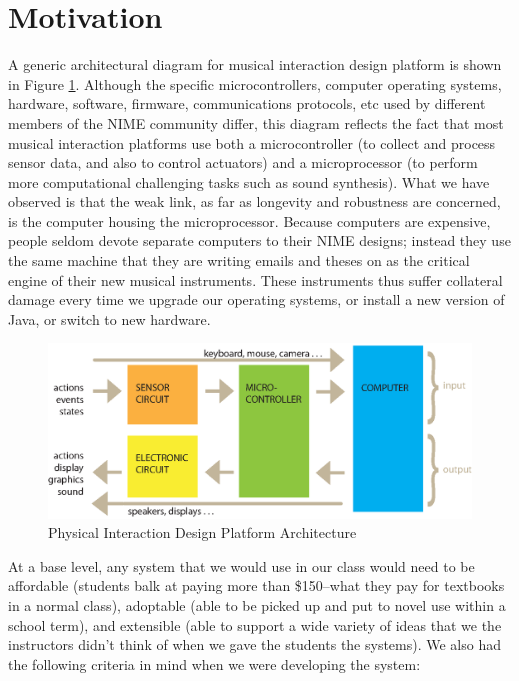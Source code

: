 \section{Motivation}


A generic architectural diagram for musical interaction design platform is shown in Figure \ref{Berdahl:fig:architecture}. Although the specific microcontrollers, computer operating systems, hardware, software, firmware, communications protocols, etc used by different members of the NIME community differ, this diagram reflects the fact that most musical interaction platforms use both a microcontroller (to collect and process sensor data, and also to control actuators) and a microprocessor (to perform more computational challenging tasks such as sound synthesis). What we have observed is that the weak link, as far as longevity and robustness are concerned, is the computer housing the microprocessor. Because computers are expensive, people seldom devote separate computers to their NIME designs; instead they use the same machine that they are writing emails and theses on as the critical engine of their new musical instruments. These instruments thus suffer collateral damage every time we upgrade our operating systems, or install a new version of Java, or switch to new hardware.

\begin{figure}[t]
	\centering
		\includegraphics[width=\textwidth]{Photos/PIDplatformarchitecture.eps}
	\caption{Physical Interaction Design Platform Architecture}
	\label{Berdahl:fig:architecture}
\end{figure}

At a base level, any system that we would use in our class would need to be affordable (students balk at paying more than \$150--what they pay for textbooks in a normal class), adoptable (able to be picked up and put to novel use within a school term), and extensible (able to support a wide variety of ideas that we the instructors didn't think of when we gave the students the systems). We also had the following criteria in mind when we were developing the system: 

